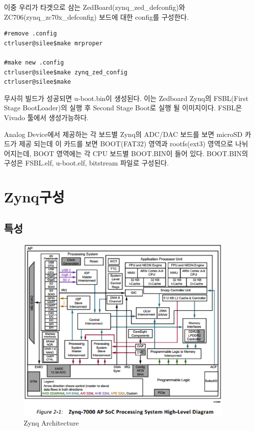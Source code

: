 \documentclass[11pt
  , a4paper
  , article
  , oneside
]{memoir}
\begin{document}
이중 우리가 타겟으로 삼는 ZedBoard(zynq\_zed\_defconfig)와 ZC706(zynq\_zc70x\_defconfig) 보드에 대한 config를 구성한다.

\begin{lstlisting}[style=termstyle]
#remove .config
ctrluser@silee$make mrproper

#make new .config
ctrluser@silee$make zynq_zed_config
ctrluser@silee$make

\end{lstlisting}

무사히 빌드가 성공되면 u-boot.bin이 생성된다. 이는 Zedboard Zynq의 FSBL(First Stage BootLoader)의 실행 후 Second Stage Boot로 실행 될 이미지이다. FSBL은 Vivado 툴에서 생성가능하다.

Analog Device에서 제공하는 각 보드별 Zynq의 ADC/DAC 보드를 보면 microSD 카드가 제공 되는데 이 카드를 보면 BOOT(FAT32) 영역과 rootfs(ext3) 영역으로 나뉘어지는데, BOOT 영역에는 각 CPU 보드별 BOOT.BIN이 들어 있다. BOOT.BIN의 구성은 FSBL.elf, u-boot.elf, bitstream 파일로 구성된다.


\chapter{Zynq구성}
\section{특성}

\begin{figure}[h!]
	\centering
	\includegraphics[width=0.95\textwidth, height=0.8\textwidth]{./images/zynq_arch.eps}
	\caption{Zynq Architecture}
	\label{fig:zynq_arch} 
\end{figure}
\end{document}
